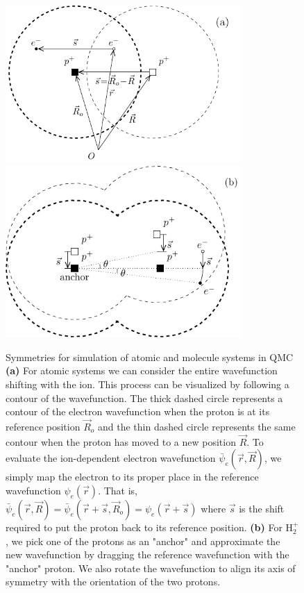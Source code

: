 \begin{figure}[t]
\includegraphics[width=9cm]{fig1a.pdf}
\includegraphics[width=9cm]{fig1b.pdf}
\caption{ Symmetries for simulation of atomic and molecule systems in QMC {\bf (a)} For atomic systems we can consider the entire wavefunction shifting with the ion. This process can be visualized by following a contour of the wavefunction. The thick dashed circle represents a contour of the electron wavefunction when the proton is at its reference position $\vec{R}_o$ and the thin dashed circle represents the same contour when the proton has moved to a new position $\vec{R}$. To evaluate the ion-dependent electron wavefunction $\bar{\psi}_e(\vec{r},\vec{R})$, we simply map the electron to its proper place in the reference wavefunction $\psi_e(\vec{r})$. That is, $\bar{\psi}_e(\vec{r},\vec{R})=\bar{\psi}_e(\vec{r}+\vec{s},\vec{R}_o)=\psi_e(\vec{r}+\vec{s})$ where $\vec{s}$ is the shift required to put the proton back to its reference position. {\bf (b)} For H$_2^+$, we pick one of the protons as an "anchor" and approximate the new wavefunction by dragging the reference wavefunction with the "anchor" proton. We also rotate the wavefunction to align its axis of symmetry with the orientation of the two protons. \label{fig:drag}}
\end{figure}

